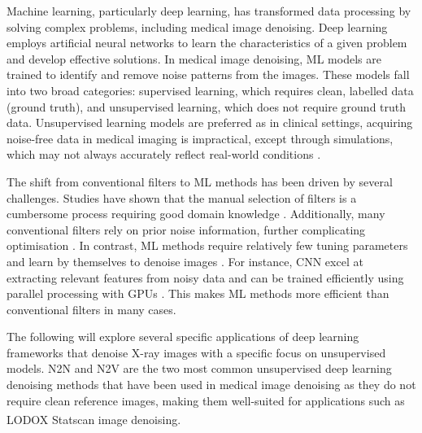 Machine learning, particularly deep learning, has transformed data processing by solving complex problems, including medical image denoising. Deep learning employs artificial neural networks to learn the characteristics of a given problem and develop effective solutions. In medical image denoising, ML models are trained to identify and remove noise patterns from the images. These models fall into two broad categories: supervised learning, which requires clean, labelled data (ground truth), and unsupervised learning, which does not require ground truth data. Unsupervised learning models are preferred as in clinical settings, acquiring noise-free data in medical imaging is impractical, except through simulations, which may not always accurately reflect real-world conditions \cite{hariharan_learning-based_2019}.

The shift from conventional filters to \gls{ML} methods has been driven by several challenges. Studies have shown that the manual selection of filters is a cumbersome process requiring good domain knowledge \cite{juneja_denoising_2024}.  Additionally, many conventional filters rely on prior noise information, further complicating optimisation \cite{juneja_denoising_2024}. In contrast, ML methods require relatively few tuning parameters and learn by themselves to denoise images \cite{nadkarni_deep_2023}. For instance,  \gls{CNN} excel at extracting relevant features from noisy data and can be trained efficiently using parallel processing with \gls{GPU}s \cite{juneja_denoising_2024}. This makes \gls{ML} methods more efficient than conventional filters in many cases.

The following will explore several specific applications of deep learning frameworks that denoise X-ray images with a specific focus on unsupervised models. \gls{N2N} and \gls{N2V} are the two most common unsupervised deep learning denoising methods that have been used in medical image denoising as they do not require clean reference images, making them well-suited for applications such as LODOX\textsuperscript{\textregistered} Statscan\textsuperscript{\textregistered} image denoising.

